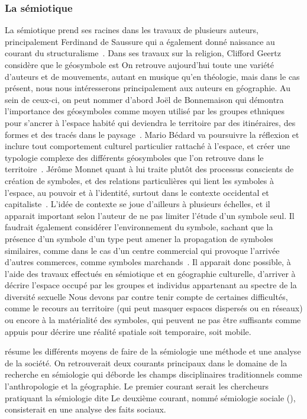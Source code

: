 \subsubsection{La sémiotique}
\label{ssub:la_semiotique}  La sémiotique prend ses racines dans les travaux de plusieurs auteurs, principalement Ferdinand de Saussure qui a également donné naissance au courant du structuralisme~\citep{Noth1995}.
Dans ses travaux sur la religion, Clifford Geertz considère que le géosymbole est
On retrouve aujourd'hui toute une variété d'auteurs et de mouvements, autant en musique qu'en théologie, mais dans le cas présent, nous nous intéresserons principalement aux auteurs en géographie.
Au sein de ceux-ci, on peut nommer d'abord Joël de Bonnemaison qui démontra l'importance des géosymboles comme moyen utilisé par les groupes ethniques pour s'ancrer à l'espace habité qui deviendra le territoire par des itinéraires, des formes et des tracés dans le paysage~\citep{Bonnemaison1981}.
Mario Bédard va poursuivre la réflexion et inclure tout comportement culturel particulier rattaché à l'espace, et créer une typologie complexe des différents géosymboles que l'on retrouve dans le territoire~\citep{Bedard2002}.
Jérôme Monnet quant à lui traite plutôt des processus conscients de création de symboles, et des relations particulières qui lient les symboles à l'espace, au pouvoir et à l'identité, surtout dans le contexte occidental et capitaliste~\citep{Monnet1998}.
L'idée de contexte se joue d'ailleurs à plusieurs échelles, et il apparait important selon l'auteur de ne pas limiter l'étude d'un symbole seul.
Il faudrait également considérer l'environnement du symbole, sachant que la présence d'un symbole d'un type peut amener la propagation de symboles similaires, comme dans le cas d'un centre commercial qui provoque l'arrivée d'autres commerces, comme symboles marchands~\citep[7-8]{Monnet1998}.
Il apparait donc possible, à l'aide des travaux effectués en sémiotique et en géographie culturelle, d'arriver à décrire l'espace occupé par les groupes et individus appartenant au spectre de la diversité sexuelle
Nous devons par contre tenir compte de certaines difficultés, comme le recours au territoire (qui peut masquer espaces dispersés ou en réseaux) ou encore à la matérialité des symboles, qui peuvent ne pas être suffisants comme appuis pour décrire une réalité spatiale soit temporaire, soit mobile.

\citet[105--109]{Rose2012} résume les différents moyens de faire de la sémiologie une méthode et une analyse de la société.
On retrouverait deux courants principaux dans le domaine de la recherche en sémiologie qui déborde les champs disciplinaires traditionnels comme l'anthropologie et la géographie.
Le premier courant serait les chercheurs pratiquant la sémiologie dite
Le deuxième courant, nommé sémiologie sociale (), consisterait en une analyse des faits sociaux.

